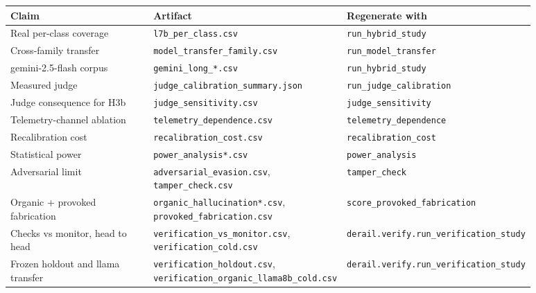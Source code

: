 \documentclass[11pt]{article}
\begin{document}
\begin{longtable}{>{\raggedright\arraybackslash}p{0.293\linewidth}>{\raggedright\arraybackslash}p{0.293\linewidth}>{\raggedright\arraybackslash}p{0.293\linewidth}}
\toprule
\textbf{Claim} & \textbf{Artifact} & \textbf{Regenerate with} \\
\midrule
\endhead
Real per-class coverage & \texttt{l7b\_\allowbreak{}per\_\allowbreak{}class.csv} & \texttt{run\_\allowbreak{}hybrid\_\allowbreak{}study} \\
Cross-family transfer & \texttt{model\_\allowbreak{}transfer\_\allowbreak{}family.csv} & \texttt{run\_\allowbreak{}model\_\allowbreak{}transfer} \\
gemini-2.5-flash corpus & \texttt{gemini\_\allowbreak{}long\_\allowbreak{}*.csv} & \texttt{run\_\allowbreak{}hybrid\_\allowbreak{}study} \\
Measured judge & \texttt{judge\_\allowbreak{}calibration\_\allowbreak{}summary.json} & \texttt{run\_\allowbreak{}judge\_\allowbreak{}calibration} \\
Judge consequence for H3b & \texttt{judge\_\allowbreak{}sensitivity.csv} & \texttt{judge\_\allowbreak{}sensitivity} \\
Telemetry-channel ablation & \texttt{telemetry\_\allowbreak{}dependence.csv} & \texttt{telemetry\_\allowbreak{}dependence} \\
Recalibration cost & \texttt{recalibration\_\allowbreak{}cost.csv} & \texttt{recalibration\_\allowbreak{}cost} \\
Statistical power & \texttt{power\_\allowbreak{}analysis*.csv} & \texttt{power\_\allowbreak{}analysis} \\
Adversarial limit & \texttt{adversarial\_\allowbreak{}evasion.csv}, \texttt{tamper\_\allowbreak{}check.csv} & \texttt{tamper\_\allowbreak{}check} \\
Organic + provoked fabrication & \texttt{organic\_\allowbreak{}hallucination*.csv}, \texttt{provoked\_\allowbreak{}fabrication.csv} & \texttt{score\_\allowbreak{}provoked\_\allowbreak{}fabrication} \\
Checks vs monitor, head to head & \texttt{verification\_\allowbreak{}vs\_\allowbreak{}monitor.csv}, \texttt{verification\_\allowbreak{}cold.csv} & \texttt{derail.verify.run\_\allowbreak{}verification\_\allowbreak{}study} \\
Frozen holdout and llama transfer & \texttt{verification\_\allowbreak{}holdout.csv}, \texttt{verification\_\allowbreak{}organic\_\allowbreak{}llama8b\_\allowbreak{}cold.csv} & \texttt{derail.verify.run\_\allowbreak{}verification\_\allowbreak{}study} \\

\end{longtable}
\end{document}
